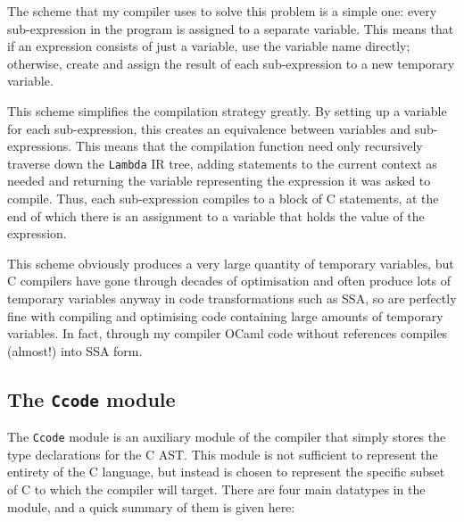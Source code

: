 \documentclass[12pt,a4paper,twoside,openright]{report}
\begin{document}
The scheme that my compiler uses to solve this problem is a simple one: every 
sub-expression in the program is assigned to a separate variable. This means 
that if an expression consists of just a variable, use the variable name 
directly; otherwise, create and assign the result of each sub-expression to a 
new temporary variable.

This scheme simplifies the compilation strategy greatly. By setting up a 
variable for each sub-expression, this creates an equivalence between variables 
and sub-expressions. This means that the compilation function need only 
recursively traverse down the \texttt{Lambda} IR tree, adding statements to the 
current context as needed and returning the variable representing the 
expression it was asked to compile. Thus, each sub-expression compiles to a 
block of C statements, at the end of which there is an assignment to a variable 
that holds the value of the expression.

This scheme obviously produces a very large quantity of temporary variables, 
but C compilers have gone through decades of optimisation and often produce 
lots of temporary variables anyway in code transformations such as SSA, so are 
perfectly fine with compiling and optimising code containing large amounts of 
temporary variables. In fact, through my compiler OCaml code without references 
compiles (almost!) into SSA form.

\subsection{The \texttt{Ccode} module}

The \texttt{Ccode} module is an auxiliary module of the compiler that simply 
stores the type declarations for the C AST. This module is not sufficient to 
represent the entirety of the C language, but instead is chosen to represent 
the specific subset of C to which the compiler will target. There are four main 
datatypes in the module, and a quick summary of them is given here:
\end{document}
